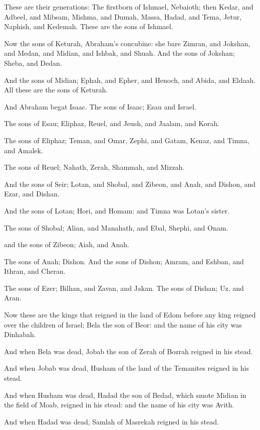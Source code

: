 \verse These are their generations: The firstborn of Ishmael, Nebaioth; then Kedar, and Adbeel, and Mibsam, \verse Mishma, and Dumah, Massa, Hadad, and Tema, \verse Jetur, Naphish, and Kedemah. These are the sons of Ishmael.

\verse Now the sons of Keturah, Abraham's concubine: she bare Zimran, and Jokshan, and Medan, and Midian, and Ishbak, and Shuah. And the sons of Jokshan; Sheba, and Dedan.

\verse And the sons of Midian; Ephah, and Epher, and Henoch, and Abida, and Eldaah. All these are the sons of Keturah.

\verse And Abraham begat Isaac. The sons of Isaac; Esau and Israel.

\verse The sons of Esau; Eliphaz, Reuel, and Jeush, and Jaalam, and Korah.

\verse The sons of Eliphaz; Teman, and Omar, Zephi, and Gatam, Kenaz, and Timna, and Amalek.

\verse The sons of Reuel; Nahath, Zerah, Shammah, and Mizzah.

\verse And the sons of Seir; Lotan, and Shobal, and Zibeon, and Anah, and Dishon, and Ezar, and Dishan.

\verse And the sons of Lotan; Hori, and Homam: and Timna was Lotan's sister.

\verse The sons of Shobal; Alian, and Manahath, and Ebal, Shephi, and Onam.

and the sons of Zibeon; Aiah, and Anah.

\verse The sons of Anah; Dishon. And the sons of Dishon; Amram, and Eshban, and Ithran, and Cheran.

\verse The sons of Ezer; Bilhan, and Zavan, and Jakan. The sons of Dishan; Uz, and Aran.

\verse Now these are the kings that reigned in the land of Edom before any king reigned over the children of Israel; Bela the son of Beor: and the name of his city was Dinhabah.

\verse And when Bela was dead, Jobab the son of Zerah of Bozrah reigned in his stead.

\verse And when Jobab was dead, Husham of the land of the Temanites reigned in his stead.

\verse And when Husham was dead, Hadad the son of Bedad, which smote Midian in the field of Moab, reigned in his stead: and the name of his city was Avith.

\verse And when Hadad was dead, Samlah of Masrekah reigned in his stead.

